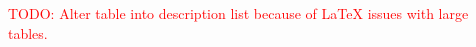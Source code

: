 \documentclass[11pt,a4paper,titlepage]{report}
\begin{document}
\textcolor{red}{TODO: Alter table into description list because of LaTeX issues with large tables.}


%
%      
%
%
%
%      
%      
\end{document}
